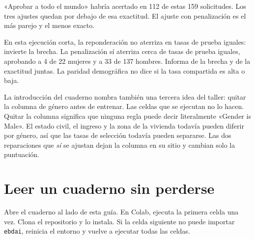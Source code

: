 \documentclass[11pt]{article}
\newcommand{\fn}[1]{\texttt{\small #1}}
\begin{document}
\noindent
«Aprobar a todo el mundo» habría acertado en 112 de estas 159 solicitudes. Los tres ajustes quedan por debajo de esa exactitud. El ajuste con penalización es el más parejo y el menos exacto.

\begin{lesson}
En esta ejecución corta, la reponderación no aterriza en tasas de prueba iguales: invierte la brecha. La penalización sí aterriza cerca de tasas de prueba iguales, aprobando a 4 de 22 mujeres y a 33 de 137 hombres. Informa de la brecha y de la exactitud juntas. La paridad demográfica no dice si la tasa compartida es alta o baja.
\end{lesson}

La introducción del cuaderno nombra también una tercera idea del taller: quitar la columna de género antes de entrenar. Las celdas que se ejecutan no lo hacen. Quitar la columna significa que ninguna regla puede decir literalmente «Gender is Male». El estado civil, el ingreso y la zona de la vivienda todavía pueden diferir por género, así que las tasas de selección todavía pueden separarse. Las dos reparaciones que \emph{sí} se ajustan dejan la columna en su sitio y cambian solo la puntuación.

\section{Leer un cuaderno sin perderse}
\label{sec:howto}

Abre el cuaderno al lado de esta guía. En Colab, ejecuta la primera celda una vez. Clona el repositorio y lo instala. Si la celda siguiente no puede importar \fn{ebdai}, reinicia el entorno y vuelve a ejecutar todas las celdas.
\end{document}
